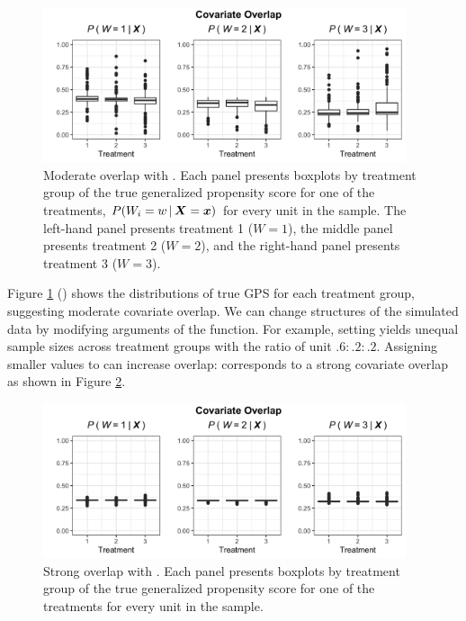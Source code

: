 \begin{figure}[H]
\centering
\includegraphics[width = 0.95\textwidth]{data_simulation_moderate_covariate_overlap.png}
\caption{Moderate overlap with . Each panel presents boxplots by treatment group of the true generalized propensity score for one of the treatments, $P(W_i = w {\, \vert \,} \bm{X}=\bm{x})$ for every unit in the sample. The left-hand panel presents treatment 1 ($W=1$), the middle panel presents treatment 2 ($W=2$), and the right-hand panel presents treatment 3 ($W=3$).}

\label{fig:covariate_overlap_moderate_plot}
\end{figure}
Figure \ref{fig:covariate_overlap_moderate_plot} () shows the distributions of true GPS for each treatment group, suggesting moderate covariate overlap. We can change structures of the simulated data by modifying  arguments of the  function.  For example, setting  yields unequal sample sizes across treatment groups with the ratio of unit $.6:.2:.2$. Assigning smaller values to  can increase overlap:  corresponds to a strong covariate overlap as shown in Figure \ref{fig:covariate_overlap_strong_plot}. 

\begin{figure}[H]
\centering
\includegraphics[width = 0.95\textwidth]{data_simulation_strong_covariate_overlap.png}
\caption{Strong overlap with . Each panel presents boxplots by treatment group of the true generalized propensity score for one of the treatments  for every unit in the sample. }
\label{fig:covariate_overlap_strong_plot}
\end{figure}

